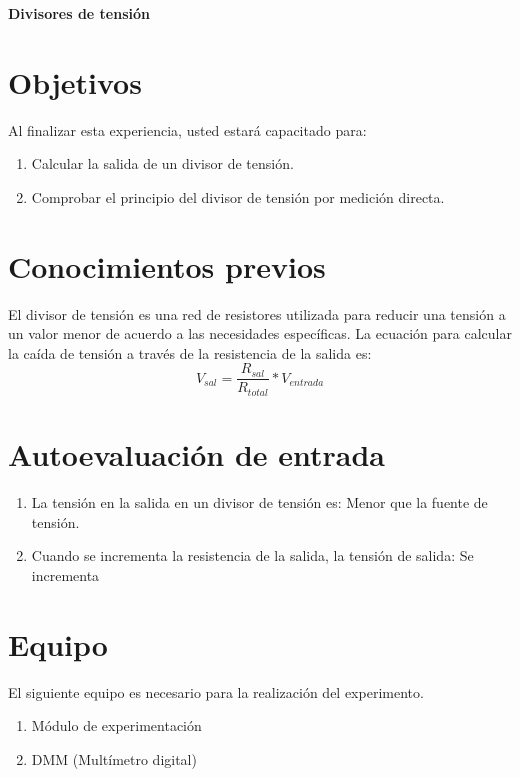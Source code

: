 \thispagestyle{fancy}
\begin{center}
	\LARGE{\textbf{Divisores de tensión}}
\end{center}
\section{Objetivos}
Al finalizar esta experiencia, usted estará capacitado para:
\begin{enumerate}
	\item	Calcular la salida de un divisor de tensión.
	\item Comprobar el principio del divisor de tensión por medición directa.
	
\end{enumerate}
\section{Conocimientos previos}
El divisor de tensión es una red de resistores utilizada para reducir una tensión a un valor menor de acuerdo a las necesidades específicas. La ecuación para calcular la caída de tensión a través de la resistencia de la salida es:
\begin{equation*}
	V_{sal}= \frac{R_{sal}}{R_{total}}*V_{entrada}
\end{equation*}
\section{Autoevaluación de entrada}
\begin{enumerate}
	\item	La tensión en la salida en un divisor de tensión es: Menor que la fuente de tensión.
	\item Cuando se incrementa la resistencia de la salida, la tensión de salida: Se incrementa
	
\end{enumerate}
\section{Equipo}
El siguiente equipo es necesario para la realización del experimento.
\begin{enumerate}
	\item 	Módulo de experimentación
	\item 	DMM (Multímetro digital)
\end{enumerate}
